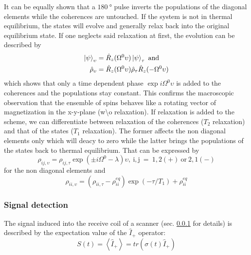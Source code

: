             It can be equally shown that a $\SI{180}{\degree}$ pulse inverts the populations of the
            diagonal elements while the coherences are untouched.
            If the system is not in thermal equilibrium, the states will evolve and generally relax back
            into the original equilibrium state. If one neglects said relaxation at first, the evolution
            can be described by 
            \begin{equation}
                \begin{split}
                    \ket\psi_\upsilon &= \hat R_z(\Omega^0\upsilon)\ket\psi_\tau ~ \mathrm{and} \\
                    \hat\rho_\upsilon &= \hat R_z(\Omega^0\upsilon)\hat\rho_\tau\hat
                    R_z(-\Omega^0\upsilon)
                \end{split}
            \end{equation}
            which shows that only a time dependent phase $\exp{i\Omega^0 \upsilon}$ is added to the coherences and the populations
            stay constant. This confirms the macroscopic observation that the ensemble of spins behaves like a rotating vector of
            magnetization in the x-y-plane (w\textbackslash o relaxation).
            If relaxation is added to the scheme, we can differentiate between relaxation of the
            coherences ($T_2$ relaxation) and that of the states ($T_1$ relaxation). The former affects
            the non diagonal elements only which will deacy to zero while the latter brings the populations of the states back to
            thermal equilibrium. That can be expressed by
            \begin{equation}
                \rho_{ij, \upsilon} = \rho_{ij, \tau} \exp{(\pm
                    i\Omega^0-\lambda)\upsilon},~\mathrm{i,j~=~
                1,2(+)~or~2,1(-)}
            \end{equation}
            for the non diagonal elements and
            \begin{equation}
                \rho_{ii,\upsilon} = (\rho_{ii,\tau} - \rho_{ii}^{eq})\exp(-\tau/T_1)+\rho_{ii}^{eq}
            \end{equation}
        \subsubsection{Signal detection}
        The signal induced into the receive coil of a scanner (sec. \ref{} for details) is described by the expectation value of the $\hat{I}_+$ operator:
        \begin{equation}
            S(t) = \left< \hat{I}_+ \right> = tr\left(\sigma(t)\hat{I}_+\right)
        \end{equation}
